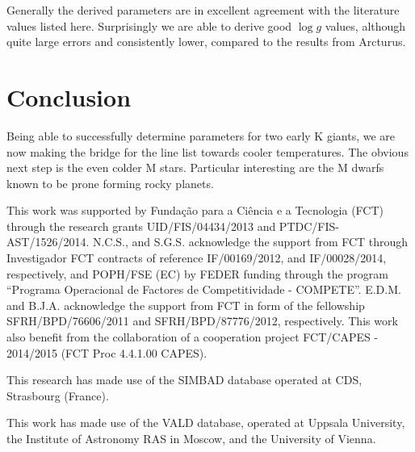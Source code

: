 \documentclass{aa}
\begin{document}
Generally the derived parameters are in excellent agreement with the literature
values listed here. Surprisingly we are able to derive good $\log g$ values,
although quite large errors and consistently lower, compared to the results from
Arcturus.


\section{Conclusion}
\label{sec:conclusion}

Being able to successfully determine parameters for two early K giants, we are
now making the bridge for the line list towards cooler temperatures. The obvious
next step is the even colder M stars. Particular interesting are the M dwarfs
known to be prone forming rocky planets.





\begin{acknowledgements}
  This work was supported by Funda\c{c}\~ao para a Ci\^encia e a
  Tecnologia (FCT) through the research grants UID/FIS/04434/2013 and
  PTDC/FIS-AST/1526/2014. N.C.S., and S.G.S. acknowledge the support from
  FCT through Investigador FCT contracts of reference IF/00169/2012, and
  IF/00028/2014, respectively, and POPH/FSE (EC) by FEDER funding through
  the program “Programa Operacional de Factores de Competitividade
  - COMPETE”. E.D.M. and B.J.A. acknowledge the support from FCT in
  form of the fellowship SFRH/BPD/76606/2011 and SFRH/BPD/87776/2012,
  respectively. This work also benefit from the collaboration of a
  cooperation project FCT/CAPES - 2014/2015 (FCT Proc 4.4.1.00 CAPES).

  This research has made use of the SIMBAD database operated at CDS,
  Strasbourg (France).

  This work has made use of the VALD database, operated at Uppsala
  University, the Institute of Astronomy RAS in Moscow, and the University
  of Vienna.
\end{acknowledgements}




\end{document}
